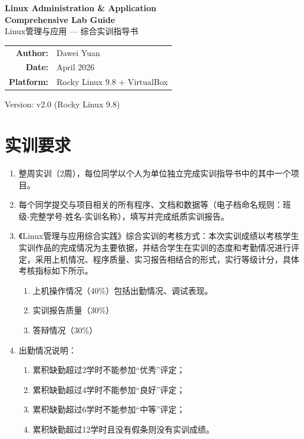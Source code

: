 \documentclass[12pt,a4paper]{ctexart}
\begin{document}
\begin{titlepage}
\begin{center}
\vspace*{3cm}

{\Huge\bfseries Linux Administration \& Application\\[8pt]Comprehensive Lab Guide}\\[14pt]
{\Large Linux管理与应用 --- 综合实训指导书}

\vspace{2cm}

\begin{tabular}{rl}
\textbf{Author:} & Dawei Yuan \\[8pt]
\textbf{Date:} & April 2026 \\[8pt]
\textbf{Platform:} & Rocky Linux 9.8 + VirtualBox
\end{tabular}

\vfill
{\small Version: v2.0 (Rocky Linux 9.8)}
\end{center}
\end{titlepage}

\newpage
\tableofcontents
\newpage

\section{实训要求}

\begin{enumerate}[label=\arabic*．,leftmargin=*]
  \item 整周实训（2周），每位同学以个人为单位独立完成实训指导书中的其中一个项目。
  \item 每个同学提交与项目相关的所有程序、文档和数据等（电子档命名规则：班级-完整学号-姓名-实训名称），填写并完成纸质实训报告。
  \item 《Linux管理与应用综合实践》综合实训的考核方式：本次实训成绩以考核学生实训作品的完成情况为主要依据，并结合学生在实训的态度和考勤情况进行评定，采用上机情况、程序质量、实习报告相结合的形式，实行等级计分，具体考核指标如下所示。
  \begin{enumerate}[label=(\arabic*)]
    \item 上机操作情况（40\%）包括出勤情况、调试表现。
    \item 实训报告质量（30\%）
    \item 答辩情况（30\%）
  \end{enumerate}

  \item 出勤情况说明：
  \begin{enumerate}[label=(\arabic*)]
    \item 累积缺勤超过2学时不能参加``优秀''评定；
    \item 累积缺勤超过4学时不能参加``良好''评定；
    \item 累积缺勤超过6学时不能参加``中等''评定；
    \item 累积缺勤超过12学时且没有假条则没有实训成绩。
  \end{enumerate}
\end{enumerate}
\end{document}
